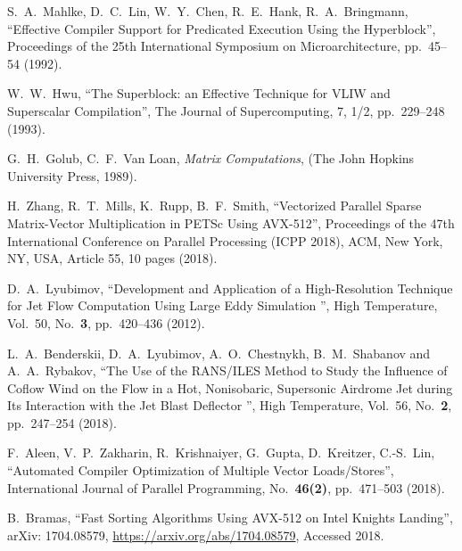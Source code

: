 \documentclass[
11pt,%
tightenlines,%
twoside,%
onecolumn,%
nofloats,%
nobibnotes,%
nofootinbib,%
superscriptaddress,%
noshowpacs,%
centertags]%
{revtex4}
\begin{document}
\begin{thebibliography}{99}
S.~A.~Mahlke, D.~C.~Lin, W.~Y.~Chen, R.~E.~Hank, R.~A.~Bringmann, \textquotedblleft Effective Compiler Support for Predicated Execution Using the Hyperblock\textquotedblright, Proceedings of the 25th International Symposium on Microarchitecture, pp.~45--54 (1992).

W.~W.~Hwu, \textquotedblleft The Superblock: an Effective Technique for VLIW and Superscalar Compilation\textquotedblright, The Journal of Supercomputing, 7, 1/2, pp.~229--248 (1993).


G.~H.~Golub, C.~F.~Van Loan, \emph{Matrix Computations}, (The John Hopkins University Press, 1989).

H.~Zhang, R.~T.~Mills, K.~Rupp, B.~F.~Smith, \textquotedblleft Vectorized Parallel Sparse Matrix-Vector Multiplication in PETSc Using AVX-512\textquotedblright, Proceedings of the 47th International Conference on Parallel Processing (ICPP 2018), ACM, New York, NY, USA, Article 55, 10 pages (2018).

D.~A.~Lyubimov, \textquotedblleft Development and Application of a High-Resolution Technique for Jet Flow Computation Using Large Eddy Simulation \textquotedblright, High Temperature, Vol.~50, No.~\textbf{3}, pp.~420--436 (2012).

L.~A.~Benderskii, D.~A.~Lyubimov, A.~O.~Chestnykh, B.~M.~Shabanov and A.~A.~Rybakov, \textquotedblleft The Use of the RANS/ILES Method to Study the Influence of Coflow Wind on the Flow in a Hot, Nonisobaric, Supersonic Airdrome Jet during Its Interaction with the Jet Blast Deflector \textquotedblright, High Temperature, Vol.~56, No.~\textbf{2}, pp.~247--254 (2018).

F.~Aleen, V.~P.~Zakharin, R.~Krishnaiyer, G.~Gupta, D.~Kreitzer, C.-S.~Lin, \textquotedblleft Automated Compiler Optimization of Multiple Vector Loads/Stores\textquotedblright, International Journal of Parallel Programming, No.~\textbf{46(2)}, pp.~471--503 (2018).


B.~Bramas, \textquotedblleft Fast Sorting Algorithms Using AVX-512 on Intel Knights Landing\textquotedblright, arXiv: 1704.08579, \url{https://arxiv.org/abs/1704.08579}, Accessed 2018.


\end{thebibliography}
\end{document}
